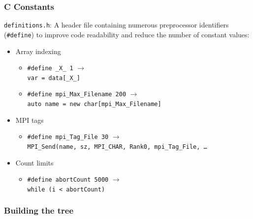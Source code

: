 \documentclass[usernames,dvipsnames]{beamer}
\begin{document}
\begin{frame}
	\frametitle{C Constants}
	
    \begin{block}{\texttt{definitions.h}:}
        A header file containing numerous preprocessor identifiers (\texttt{\#define}) to improve code readability and reduce the number of constant values:
        \begin{itemize}
            \item Array indexing
                \begin{itemize}
                    \item \texttt{\#define \_X\_ 1} $\rightarrow$  \\
                    \texttt{var = data[\_X\_]}
                    \item \texttt{\#define mpi\_Max\_Filename 200} $\rightarrow$ \\
                    \texttt{auto name = new char[mpi\_Max\_Filename]}
                \end{itemize}
            \item MPI tags
                \begin{itemize}
                    \item \texttt{\#define mpi\_Tag\_File 30} $\rightarrow$ \\
                    \texttt{MPI\_Send(name, sz, MPI\_CHAR, Rank0, mpi\_Tag\_File, \ldots}
                \end{itemize}
            \item Count limits
                \begin{itemize}
                    \item \texttt{\#define abortCount 5000} $\rightarrow$ \\
                    \texttt{while (i < abortCount)}
                \end{itemize}
    		\end{itemize}
    	\end{block}
		
\end{frame}

\subsubsection{Building the tree}
\end{document}
